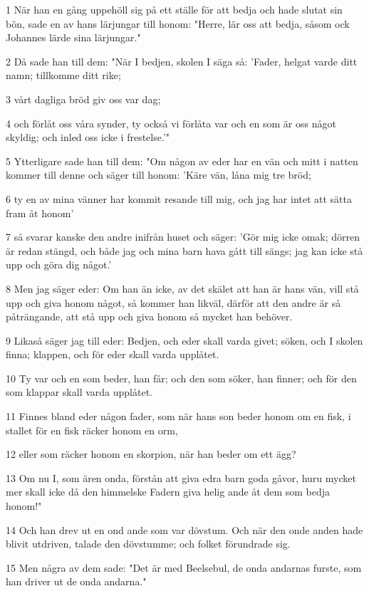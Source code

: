 \par 1 När han en gång uppehöll sig på ett ställe för att bedja och hade slutat sin bön, sade en av hans lärjungar till honom: "Herre, lär oss att bedja, såsom ock Johannes lärde sina lärjungar."
\par 2 Då sade han till dem: "När I bedjen, skolen I säga så: 'Fader, helgat varde ditt namn; tillkomme ditt rike;
\par 3 vårt dagliga bröd giv oss var dag;
\par 4 och förlåt oss våra synder, ty också vi förlåta var och en som är oss något skyldig; och inled oss icke i frestelse.'"
\par 5 Ytterligare sade han till dem: "Om någon av eder har en vän och mitt i natten kommer till denne och säger till honom: 'Käre vän, låna mig tre bröd;
\par 6 ty en av mina vänner har kommit resande till mig, och jag har intet att sätta fram åt honom'
\par 7 så svarar kanske den andre inifrån huset och säger: 'Gör mig icke omak; dörren är redan stängd, och både jag och mina barn hava gått till sängs; jag kan icke stå upp och göra dig något.'
\par 8 Men jag säger eder: Om han än icke, av det skälet att han är hans vän, vill stå upp och giva honom något, så kommer han likväl, därför att den andre är så påträngande, att stå upp och giva honom så mycket han behöver.
\par 9 Likaså säger jag till eder: Bedjen, och eder skall varda givet; söken, och I skolen finna; klappen, och för eder skall varda upplåtet.
\par 10 Ty var och en som beder, han får; och den som söker, han finner; och för den som klappar skall varda upplåtet.
\par 11 Finnes bland eder någon fader, som när hans son beder honom om en fisk, i stallet för en fisk räcker honom en orm,
\par 12 eller som räcker honom en skorpion, när han beder om ett ägg?
\par 13 Om nu I, som ären onda, förstån att giva edra barn goda gåvor, huru mycket mer skall icke då den himmelske Fadern giva helig ande åt dem som bedja honom!"
\par 14 Och han drev ut en ond ande som var dövstum. Och när den onde anden hade blivit utdriven, talade den dövstumme; och folket förundrade sig.
\par 15 Men några av dem sade: "Det är med Beelsebul, de onda andarnas furste, som han driver ut de onda andarna."
